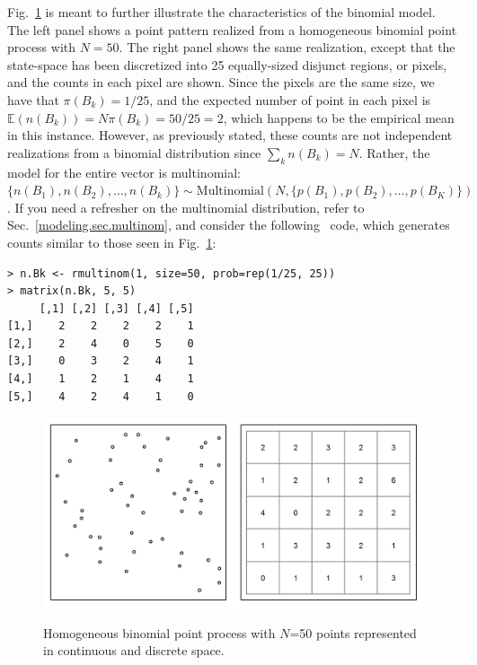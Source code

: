 Fig.~\ref{state-space.fig.homo} is meant to further illustrate the characteristics
of the binomial model. The left panel shows a point pattern
realized from a
homogeneous binomial point process with $N=50$. The right panel shows
the same realization, except that the state-space has been discretized
into 25 equally-sized disjunct regions, or pixels, and the counts in each pixel
are shown. Since the pixels are the same
size, we have that $\pi(B_k) = 1/25$, and the expected number of point in each
pixel is $\mathbb{E}(n(B_k)) = N\pi(B_k) = 50/25 = 2$, which
happens to be the empirical mean in this instance. However, as
previously stated, these counts are not
independent realizations from a binomial distribution since $\sum_k
n(B_k) = N$. Rather, the model for the entire vector is multinomial:
$\{n(B_1), n(B_2), \dots, n(B_k)\} \sim \mbox{Multinomial}(N, \{p(B_1), p(B_2), \dots,
p(B_K) \})$ \citep{illian_etal:2008}. If you need a refresher on the
multinomial distribution, refer to Sec.~\ref{modeling.sec.multinom}, and
consider the following \R~code, which generates counts similar to those
seen in Fig.~\ref{state-space.fig.homo}:
\begin{verbatim}
> n.Bk <- rmultinom(1, size=50, prob=rep(1/25, 25))
> matrix(n.Bk, 5, 5)
     [,1] [,2] [,3] [,4] [,5]
[1,]    2    2    2    2    1
[2,]    2    4    0    5    0
[3,]    0    3    2    4    1
[4,]    1    2    1    4    1
[5,]    4    2    4    1    0
\end{verbatim}

\begin{figure}%
\centering
\includegraphics[width=\textwidth]{Ch11-Statespace/figs/homoPlots}
\label{state-space.fig.homo}
\caption{Homogeneous binomial point process with $N$=50 points
  represented in continuous and discrete space.}
\end{figure}


